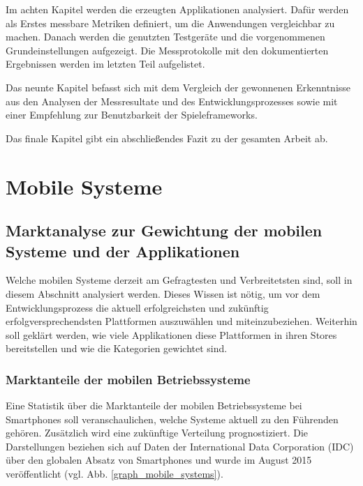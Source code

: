 \bigskip
Im achten Kapitel werden die erzeugten Applikationen analysiert. Dafür werden als Erstes messbare Metriken definiert, um die Anwendungen vergleichbar zu machen. Danach werden die genutzten Testgeräte und die vorgenommenen Grundeinstellungen aufgezeigt. Die Messprotokolle mit den dokumentierten Ergebnissen werden im letzten Teil aufgelistet.

\bigskip
Das neunte Kapitel befasst sich mit dem Vergleich der gewonnenen Erkenntnisse aus den Analysen der Messresultate und des Entwicklungsprozesses sowie mit einer Empfehlung zur Benutzbarkeit der Spieleframeworks.

\bigskip
Das finale Kapitel gibt ein abschließendes Fazit zu der gesamten Arbeit ab.

\chapter{Mobile Systeme}

\section{Marktanalyse zur Gewichtung der mobilen Systeme und der Applikationen}
Welche mobilen Systeme derzeit am Gefragtesten und Verbreitetsten sind, soll in diesem Abschnitt analysiert werden. Dieses Wissen ist nötig, um vor dem Entwicklungsprozess die aktuell erfolgreichsten und zukünftig erfolgversprechendsten Plattformen auszuwählen und miteinzubeziehen.
Weiterhin soll geklärt werden, wie viele Applikationen diese Plattformen in ihren Stores bereitstellen und wie die Kategorien gewichtet sind.

\subsection{Marktanteile der mobilen Betriebssysteme}
\label{subsec:Marktanteile_mobile_Systeme}
Eine Statistik über die Marktanteile der mobilen Betriebssysteme bei Smartphones soll veranschaulichen, welche Systeme aktuell zu den Führenden gehören. Zusätzlich wird eine zukünftige Verteilung prognostiziert. Die Darstellungen beziehen sich auf Daten der International Data Corporation (IDC) über den globalen Absatz von Smartphones und wurde im August 2015 veröffentlicht (vgl. Abb. \ref{graph_mobile_systems}). 

